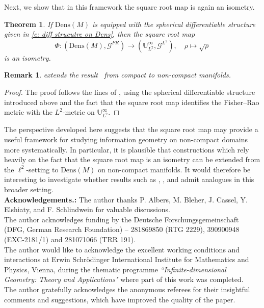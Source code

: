 \documentclass[12pt]{amsart}
\newtheorem{theorem}{Theorem}[section]
\newtheorem{remark}[remark]{Remark}
\numberwithin{figure}{section}
\numberwithin{table}{section}
\numberwithin{equation}{section}
\begin{document}
Next, we show that in this framework the square root map is again an isometry.

\begin{theorem}\label{thM:square_roor_isom_for_non_closed_mnfds}
If \(\mathrm{Dens}(M)\) is equipped with the spherical differentiable structure given in \eqref{e: diff strucutre on Dens}, then the square root map
\[
    \varPhi:  \left(\mathrm{Dens}(M), \mathcal{G}^{FR}\right) \longrightarrow \left(\mathbb{U}_{L^2}^{\infty}, \mathcal{G}^{L^2}\right), \quad \rho \mapsto \sqrt{\rho}
\]
is an isometry.
\end{theorem}

\begin{remark}
 extends the result~\cite[Thm.~3.1]{khesin_GAFA} from compact to non-compact manifolds.
\end{remark}

\begin{proof}
The proof follows the lines of \cite[Thm.~3.1]{khesin_GAFA}, using the spherical differentiable structure introduced above and the fact that the square root map identifies the Fisher--Rao metric with the \(L^2\)-metric on \(\mathbb{U}_{L^2}^{\infty}\).
\end{proof}

The perspective developed here suggests that the square root map may provide a useful framework for studying information geometry on non-compact domains more systematically. In particular, it is plausible that constructions which rely heavily on the fact that the square root map is an isometry can be extended from the \(\ell^2\)-setting to \(\mathrm{Dens}(M)\) on non-compact manifolds. It would therefore be interesting to investigate whether results such as , , and  admit analogues in this broader setting.\\

\noindent
\textbf{Acknowledgements.:}
The author thanks P. Albers, M. Bleher, J. Cassel, Y. Elshiaty, and F. Schlindwein for valuable discussions.\\
The author acknowledges funding by the Deutsche Forschungsgemeinschaft (DFG, German Research Foundation) – 281869850 (RTG 2229), 390900948 (EXC-2181/1) and 281071066 (TRR 191).\\
The author would like to acknowledge the excellent working
conditions and interactions at Erwin Schrödinger International
Institute for Mathematics and Physics, Vienna, during the thematic
programme \emph{``Infinite-dimensional Geometry: Theory and Applications"}
where part of this work was completed.\\
The author gratefully acknowledges the anonymous referees for their insightful comments and suggestions, which have improved the quality of the paper.
\\
\end{document}
